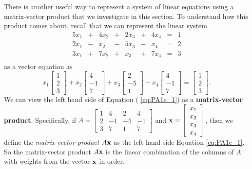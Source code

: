 \label{sec:mv_form_intro}

There is another useful way to represent a system of linear equations using a matrix-vector product that we investigate in this section. To understand how this product comes about, recall that we can represent the linear system 
\begin{alignat*}{5}
x_1 		&{}+{} 	&{4}x_2 	&{}+{}	&{2}x_3 	&{}+{}	&{4}x_4	&{}={}	&1 \\
{2}x_1 	&{}-{} 	&{}x_2 		&{}-{}	&{5}x_3 	&{}-{}	&{}x_4	&{}={}	&2 \\
{3}x_1 	&{}+{} 	&{7}x_2 	&{}+{}	&{}x_3 		&{}+{}	&{7}x_4	&{}={}	&3 \\
\end{alignat*}
as a vector equation as
\begin{equation} \label{eq:PA1e_1}
x_1\left[ \begin{array}{c} 1\\2\\3 \end{array} \right] + x_2\left[ \begin{array}{r} 4\\-1\\7 \end{array} \right] + x_3\left[ \begin{array}{r} 2\\-5\\1 \end{array} \right] + x_4\left[ \begin{array}{r} 4\\-1\\7 \end{array} \right]= \left[ \begin{array}{c} 1\\2\\3 \end{array} \right].
\end{equation}
We can view the left hand side of Equation ( \ref{eq:PA1e_1}) as a \textbf{matrix-vector product}. Specifically, if $A = \left[ \begin{array}{crrr} 1&4&2&4 \\ 2&-1&-5&-1 \\ 3&7&1&7 \end{array} \right]$ and $\mathbf{x} = \left[ \begin{array}{c} x_1 \\x_2 \\x_3 \\x_4 \end{array} \right]$, then we define the \emph{matrix-vector product} $A\mathbf{x}$ as the left hand side Equation \eqref{eq:PA1e_1}. So the matrix-vector product $A\mathbf{x}$ is the linear combination of the columns of $A$ with weights from the vector $\mathbf{x}$ in order. 

